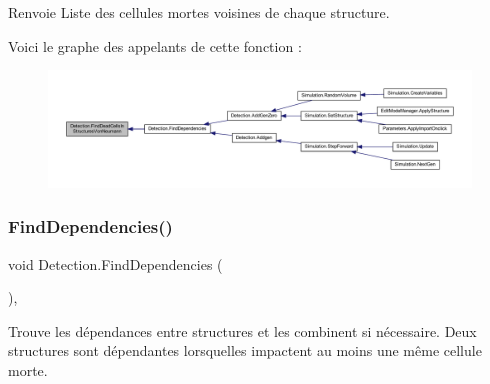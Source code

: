 \begin{DoxyReturn}{Renvoie}
Liste des cellules mortes voisines de chaque structure.
\end{DoxyReturn}
Voici le graphe des appelants de cette fonction \+:
\nopagebreak
\begin{figure}[H]
\begin{center}
\leavevmode
\includegraphics[width=350pt]{class_detection_aeea8bac4d15d3dd92d6b907b357c1680_icgraph}
\end{center}
\end{figure}
\mbox{\label{class_detection_a0f5d7b85c0daaf07503132a2faa23bcf}} 
\subsubsection{\texorpdfstring{Find\+Dependencies()}{FindDependencies()}}
{\footnotesize\ttfamily void Detection.\+Find\+Dependencies (\begin{DoxyParamCaption}{ }\end{DoxyParamCaption})\hspace{0.3cm}{\ttfamily [inline]}, {\ttfamily [private]}}



Trouve les dépendances entre structures et les combinent si nécessaire. Deux structures sont dépendantes lorsqu\textquotesingle{}elles impactent au moins une même cellule morte. 

